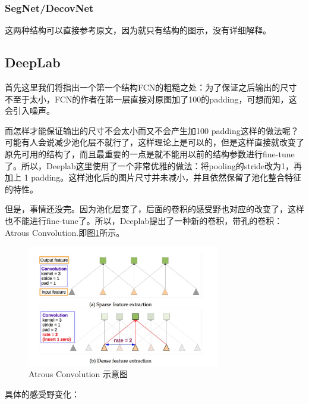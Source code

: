 \subsubsection{SegNet/DecovNet}

这两种结构可以直接参考原文，因为就只有结构的图示，没有详细解释。

\subsection{DeepLab}

首先这里我们将指出一个第一个结构FCN的粗糙之处：为了保证之后输出的尺寸不至于太小，FCN的作者在第一层直接对原图加了100的padding，可想而知，这会引入噪声。

而怎样才能保证输出的尺寸不会太小而又不会产生加100 padding这样的做法呢？可能有人会说减少池化层不就行了，这样理论上是可以的，但是这样直接就改变了原先可用的结构了，而且最重要的一点是就不能用以前的结构参数进行fine-tune了。所以，Deeplab这里使用了一个非常优雅的做法：将pooling的stride改为1，再加上 1 padding。这样池化后的图片尺寸并未减小，并且依然保留了池化整合特征的特性。 

但是，事情还没完。因为池化层变了，后面的卷积的感受野也对应的改变了，这样也不能进行fine-tune了。所以，Deeplab提出了一种新的卷积，带孔的卷积：Atrous Convolution.即图\ref{DeepLabAtrousConvolution0}所示。

\begin{figure}[!hbtp]
\centering
\includegraphics[width=0.75\textwidth]{SemanticSLAM/DeepLabAtrousConvolution0.jpg}
\caption{Atrous Convolution 示意图}
\label{DeepLabAtrousConvolution0}
\end{figure}

具体的感受野变化：

